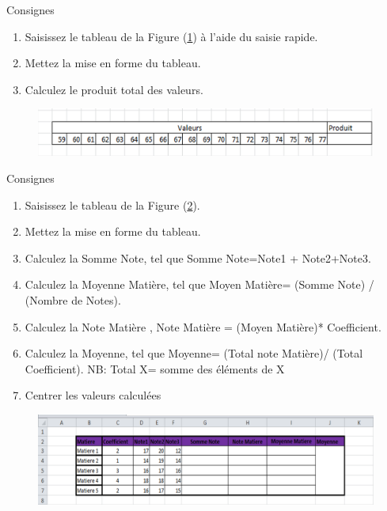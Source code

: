 \begin{exercice}\label{ex9}
	Consignes 
	\begin{enumerate}		
		\item  Saisissez le tableau  de la Figure (\ref{exo9}) à l'aide du saisie rapide.  				
		\item  Mettez la mise en forme  du tableau.
		\item  Calculez le produit total des valeurs.
	\end{enumerate}	
\end{exercice}
\begin{figure}[H]
	\centering
	\includegraphics[scale=0.2,width= \linewidth]{img/ex09}
	 \label{exo9}
\end{figure}

\begin{exercice}\label{ex10}
	Consignes 
	\begin{enumerate}		
		\item  Saisissez le tableau  de la Figure (\ref{exo10}).  				
		\item  Mettez la mise en forme  du tableau.
		\item  Calculez la Somme Note,  tel que Somme Note=Note1 + Note2+Note3.
		\item  Calculez la Moyenne Matière,  tel que Moyen Matière= (Somme Note) / (Nombre de Notes).
		\item  Calculez la Note Matière ,  Note Matière = (Moyen Matière)* Coefficient.
		\item  Calculez la Moyenne,  tel que Moyenne= (Total note Matière)/ (Total Coefficient).
		\subitem NB: Total X= somme des éléments de X
		\item Centrer les valeurs calculées			
	\end{enumerate}	
\end{exercice}
\begin{figure}[H]
	\centering
	\includegraphics[scale=0.2,width= \linewidth]{img/ex010}
	 \label{exo10}
\end{figure}

